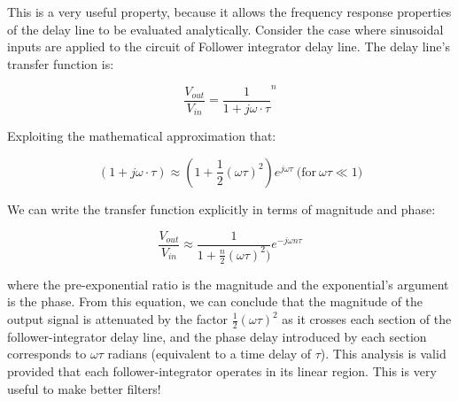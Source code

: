 This is a very useful property, because it allows the frequency response
properties of the delay line to be evaluated analytically. Consider the case
where sinusoidal inputs are applied to the circuit of Follower integrator delay line. The delay line’s transfer function is:

\begin{equation}
    \frac{V_{out}}{V_{in}} = \frac{1}{1 + j\omega \cdot \tau}^n
\end{equation}

Exploiting the mathematical approximation that: 

\begin{equation}
    (1 + j \omega \cdot \tau) \approx (1 + \frac{1}{2}(\omega \tau)^2)e^{j \omega \tau} \mathrm{\ (for }\ \omega \tau \ll 1)
\end{equation}

We can write the transfer function explicitly in terms of magnitude and phase: 

\begin{equation}
    \frac{V_{out}}{V_{in}} \approx \frac{1}{1 + \frac{n}{2}(\omega \tau)^2)}e^{-j \omega n \tau}
\end{equation}

where the pre-exponential ratio is the magnitude and the exponential’s argument is the phase. From this equation, we can conclude that the magnitude of the output signal is attenuated by the factor $\frac{1}{2}(\omega \tau)^2$ as it crosses each section of the follower-integrator delay line, and the phase delay introduced by each section corresponds to $\omega \tau$ radians (equivalent to a time delay of $\tau$). This analysis is valid provided that each follower-integrator operates in its linear region. This is very useful to make better filters!

